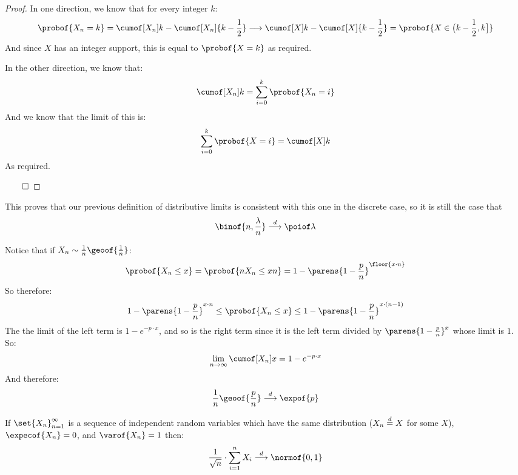 \begin{proof}

	In one direction, we know that for every integer $k$:
	\[ \probof{X_n=k} = \cumof[X_n]k - \cumof[X_n]{k-\frac12} \longrightarrow \cumof[X]k - \cumof[X]{k-\frac12} =
	\probof{X\in\big(k-\frac12,k\big]} \]
	And since $X$ has an integer support, this is equal to $\probof{X=k}$ as required.

	In the other direction, we know that:
	\[ \cumof[X_n]k = \sum_{i=0}^k\probof{X_n=i} \]
	And we know that the limit of this is:
	\[ \sum_{i=0}^k\probof{X=i} = \cumof[X]k \]
	As required.

	\hfill$\qed$

\end{proof}

This proves that our previous definition of distributive limits is consistent with this one in the discrete case, so it is still the case that
\[ \binof{n,\frac\lambda n}\dilim\poiof\lambda \]

\begin{exam}

	Notice that if $X_n\sim\frac1n\geoof{\frac1n}$:
	\[ \probof{X_n\leq x} = \probof{nX_n\leq xn} = 1-\parens{1-\frac pn}^{\floor{x\cdot n}} \]
	So therefore:
	\[ 1-\parens{1-\frac pn}^{x\cdot n} \leq \probof{X_n\leq x} \leq 1-\parens{1-\frac pn}^{x\cdot(n-1)} \]
	The the limit of the left term is $1-e^{-p\cdot x}$, and so is the right term since it is the left term divided by $\parens{1-\frac pn}^x$
	whose limit is $1$.
	So:
	\[ \lim_{n\to\infty} \cumof[X_n]x = 1-e^{-p\cdot x} \]
	And therefore:
	\[ \frac1n\geoof{\frac pn}\dilim\expof{p} \]

\end{exam}

\begin{thrm*}

	If $\set{X_n}_{n=1}^\infty$ is a sequence of independent random variables which have the same distribution ($X_n\mathrel{\overset d=} X$ for some $X$),
	$\expecof{X_n}=0$, and $\varof{X_n}=1$ then:
	\[ \frac1{\sqrt n}\cdot\sum_{i=1}^n X_i\dilim\normof{0,1} \]

\end{thrm*}

